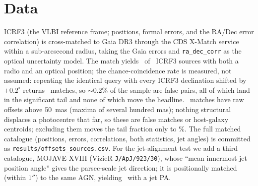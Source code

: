 \documentclass[twocolumn]{aastex631}
\newcommand{\code}[1]{\texttt{#1}}
\begin{document}
\section{Data}
ICRF3 \citep{icrf3} (the VLBI reference frame; positions, formal errors, and the RA/Dec error
correlation) is cross-matched to Gaia DR3 \citep{gaiadr3} through the CDS X-Match service
\citep{cdsxmatch} within a sub-arcsecond radius, taking the Gaia errors and \code{ra\_dec\_corr}
as the optical uncertainty model. The match yields \offN\ of \offNicrf\ ICRF3 sources with both a
radio and an optical position; the chance-coincidence rate is measured, not assumed: repeating
the identical query with every ICRF3 declination shifted by $+0.2^\circ$ returns \offNchance\
matches, so $\sim$0.2\% of the sample are false pairs, all of which land in the significant tail
and none of which move the headline. \offNgtFifty\ matches have raw offsets above 50~mas (maxima
of several hundred mas); nothing structural displaces a photocentre that far, so these are
false matches or host-galaxy centroids; excluding them moves the tail fraction only to
\offFracTailLeFifty\%. The full matched catalogue (positions, errors, correlations, both
statistics, jet angles) is committed as \code{results/offsets\_sources.csv}. For the
jet-alignment test we add a third catalogue, MOJAVE XVIII \citep{lister2021} (VizieR
\code{J/ApJ/923/30}), whose ``mean innermost jet position angle'' gives the parsec-scale jet
direction; it is positionally matched (within $1''$) to the same AGN, yielding \offJetN\ with a
jet PA.
\end{document}
